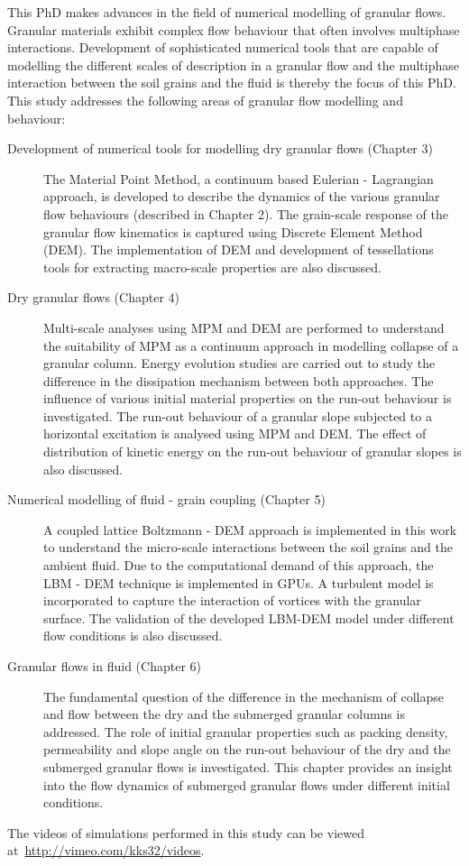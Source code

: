 This PhD makes advances in the field of numerical modelling of granular flows. 
Granular materials exhibit complex flow behaviour that often involves 
multiphase interactions. Development of sophisticated numerical tools that are 
capable of modelling the different scales of description in a granular flow and 
the multiphase interaction between the soil grains and the fluid is thereby the 
focus of this PhD. This study addresses the following 
areas of granular flow modelling and behaviour:
%
\begin{description}
\item[Development of numerical tools for modelling dry granular flows (Chapter 
3)]{The Material Point Method, a continuum based Eulerian - Lagrangian 
approach, is developed to describe the dynamics of the various granular flow 
behaviours (described in Chapter 2). The grain-scale response of the granular 
flow kinematics is captured using Discrete Element Method (DEM). The 
implementation of DEM and development of tessellations tools for extracting 
macro-scale properties are also discussed.}

\item[Dry granular flows (Chapter 4)] {Multi-scale analyses using MPM and DEM 
are performed to understand the suitability of MPM as a continuum approach in 
modelling collapse of a granular column. Energy evolution studies are carried 
out to study the difference in the dissipation mechanism between both 
approaches. The influence of various initial material properties on the run-out 
behaviour is investigated. The run-out behaviour of a granular slope subjected 
to a horizontal excitation is analysed using MPM and DEM. The effect of 
distribution of kinetic energy on the run-out behaviour of granular slopes is 
also discussed.}

\item[Numerical modelling of fluid - grain coupling (Chapter 5)]{A coupled 
lattice Boltzmann - DEM approach is implemented in this work to understand the 
micro-scale interactions between the soil grains and the ambient fluid. Due to 
the computational demand of this approach, the LBM - DEM technique is 
implemented in GPUs. A turbulent model is incorporated to capture the
interaction of vortices with the granular surface. The validation of 
the developed LBM-DEM model under different flow conditions is also discussed.}

\item[Granular flows in fluid (Chapter 6)]{The fundamental question of the 
difference in the mechanism of collapse and flow between the dry and the 
submerged granular columns is addressed. The role of initial granular 
properties such as packing density, permeability and slope angle on the run-out 
behaviour of the dry and the submerged granular flows is investigated. This 
chapter provides an insight into the flow dynamics of submerged granular flows 
under different initial conditions.
}
\end{description}

The videos of simulations performed in this study can be viewed 
at~\url{http://vimeo.com/kks32/videos}. 